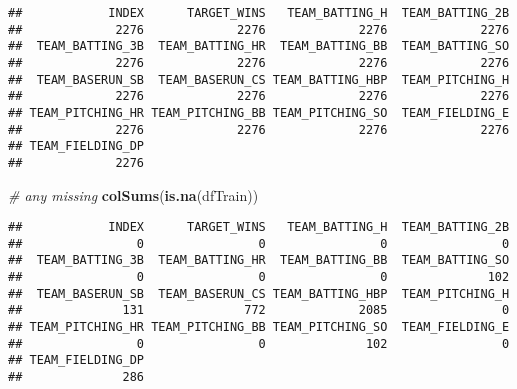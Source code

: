 \documentclass[
]{article}
\newenvironment{Shaded}{\begin{snugshade}}{\end{snugshade}}
\newcommand{\AlertTok}[1]{\textcolor[rgb]{0.94,0.16,0.16}{#1}}
\newcommand{\CommentTok}[1]{\textcolor[rgb]{0.56,0.35,0.01}{\textit{#1}}}
\newcommand{\DataTypeTok}[1]{\textcolor[rgb]{0.13,0.29,0.53}{#1}}
\newcommand{\KeywordTok}[1]{\textcolor[rgb]{0.13,0.29,0.53}{\textbf{#1}}}
\newcommand{\NormalTok}[1]{#1}
\newcommand{\OperatorTok}[1]{\textcolor[rgb]{0.81,0.36,0.00}{\textbf{#1}}}
\newcommand{\StringTok}[1]{\textcolor[rgb]{0.31,0.60,0.02}{#1}}
\begin{document}
\begin{verbatim}
##            INDEX      TARGET_WINS   TEAM_BATTING_H  TEAM_BATTING_2B 
##             2276             2276             2276             2276 
##  TEAM_BATTING_3B  TEAM_BATTING_HR  TEAM_BATTING_BB  TEAM_BATTING_SO 
##             2276             2276             2276             2276 
##  TEAM_BASERUN_SB  TEAM_BASERUN_CS TEAM_BATTING_HBP  TEAM_PITCHING_H 
##             2276             2276             2276             2276 
## TEAM_PITCHING_HR TEAM_PITCHING_BB TEAM_PITCHING_SO  TEAM_FIELDING_E 
##             2276             2276             2276             2276 
## TEAM_FIELDING_DP 
##             2276
\end{verbatim}

\begin{Shaded}
\begin{Highlighting}[]
\CommentTok{# any missing}
\KeywordTok{colSums}\NormalTok{(}\KeywordTok{is.na}\NormalTok{(dfTrain))}
\end{Highlighting}
\end{Shaded}

\begin{verbatim}
##            INDEX      TARGET_WINS   TEAM_BATTING_H  TEAM_BATTING_2B 
##                0                0                0                0 
##  TEAM_BATTING_3B  TEAM_BATTING_HR  TEAM_BATTING_BB  TEAM_BATTING_SO 
##                0                0                0              102 
##  TEAM_BASERUN_SB  TEAM_BASERUN_CS TEAM_BATTING_HBP  TEAM_PITCHING_H 
##              131              772             2085                0 
## TEAM_PITCHING_HR TEAM_PITCHING_BB TEAM_PITCHING_SO  TEAM_FIELDING_E 
##                0                0              102                0 
## TEAM_FIELDING_DP 
##              286
\end{verbatim}

\begin{Shaded}
\end{Shaded}
\end{document}
